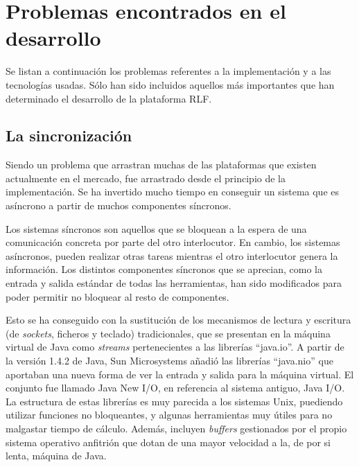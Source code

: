 

\section{Problemas encontrados en el desarrollo}
Se listan a continuación los problemas referentes a la implementación 
y a las tecnologías usadas. Sólo han sido incluidos aquellos más importantes 
que han determinado el desarrollo de la plataforma RLF.

\subsection{La sincronización}
Siendo un problema que arrastran muchas de las plataformas que existen 
actualmente en el mercado, fue arrastrado desde el principio de la 
implementación. Se ha invertido mucho tiempo en conseguir un sistema 
que es asíncrono a partir de muchos componentes síncronos.

Los sistemas síncronos \cite{SistemasOperativos} son aquellos que se 
bloquean a la espera de una comunicación concreta por parte del otro 
interlocutor. En cambio, los sistemas asíncronos, pueden realizar 
otras tareas mientras el otro interlocutor genera la información. Los 
distintos componentes síncronos que se aprecian, como la entrada y 
salida estándar de todas las herramientas, han sido modificados para 
poder permitir no bloquear al resto de componentes.

Esto se ha conseguido con la sustitución de los mecanismos de lectura 
y escritura (de \emph{sockets}, ficheros y teclado) tradicionales, que 
se presentan en la máquina virtual de Java como \emph{streams} 
pertenecientes a las librerías ``java.io''. A partir de la versión 
1.4.2 de Java, Sun Microsystems añadió las librerías ``java.nio'' 
 \cite{JavaNIO} que aportaban una nueva forma de ver 
la entrada y salida para la máquina virtual. El conjunto fue llamado 
Java New I/O, en referencia al sistema antiguo, Java I/O. La 
estructura de estas librerías es muy parecida a los sistemas Unix, 
puediendo utilizar funciones no bloqueantes, y algunas herramientas 
muy útiles para no malgastar tiempo de cálculo. Además, incluyen 
\emph{buffers} gestionados por el propio sistema operativo anfitrión 
que dotan de una mayor velocidad a la, de por si lenta, máquina de 
Java.

